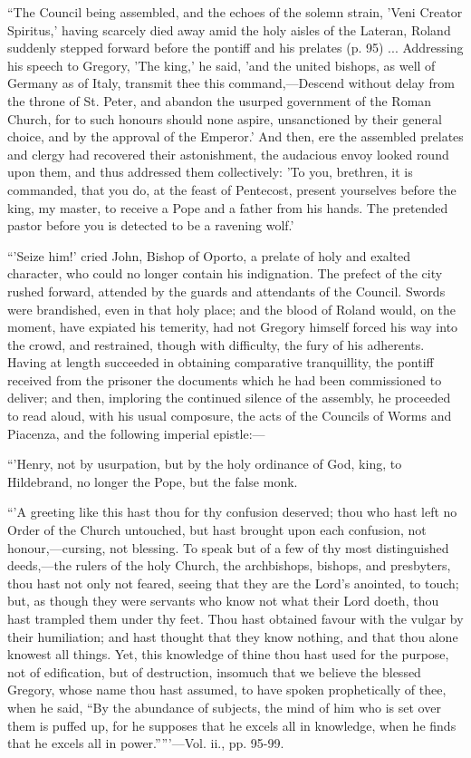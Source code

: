 ``The
Council being assembled, and the echoes of the solemn strain, 'Veni
Creator Spiritus,' having scarcely died away amid the holy aisles of
the Lateran, Roland suddenly stepped forward before the pontiff and
his prelates (p. 95) ... Addressing his speech to Gregory, 'The king,'
he said, 'and the united bishops, as well of Germany as of Italy,
transmit thee this command,—Descend without delay from the throne of
St. Peter, and abandon the usurped government of the Roman Church, for
to such honours should none aspire, unsanctioned by their general
choice, and by the approval of the Emperor.' And then, ere the
assembled prelates and clergy had recovered their astonishment, the
audacious envoy looked round upon them, and thus addressed them
collectively: 'To you, brethren, it is commanded, that you do, at the
feast of Pentecost, present yourselves before the king, my master, to
receive a Pope and a father from his hands. The pretended pastor
before you is detected to be a ravening wolf.'

``'Seize
him!' cried John, Bishop of Oporto, a prelate of holy and exalted
character, who could no longer contain his indignation. The prefect of
the city rushed forward, attended by the guards and attendants of the
Council. Swords were brandished, even in that holy place; and the
blood of Roland would, on the moment, have expiated his temerity, had
not Gregory himself forced his way into the crowd, and restrained,
though with difficulty, the fury of his adherents. Having at length
succeeded in obtaining comparative tranquillity, the pontiff received
from the prisoner the documents which he had been commissioned to
deliver; and then, imploring the continued silence of the assembly, he
proceeded to read aloud, with his usual composure, the acts of the
Councils of Worms and Piacenza, and the following imperial epistle:—

``'Henry,
not by usurpation, but by the holy ordinance of God, king, to
Hildebrand, no longer the Pope, but the false monk.

``'A
greeting like this hast thou for thy confusion deserved; thou who hast
left no Order of the Church untouched, but hast brought upon each
confusion, not honour,—cursing, not blessing. To speak but of a few
of thy most distinguished deeds,—the rulers of the holy Church, the
archbishops, bishops, and presbyters, thou hast not only not feared,
seeing that they are the Lord's anointed, to touch; but, as though
they were servants who know not what their Lord doeth, thou hast
trampled them under thy feet. Thou hast obtained favour with the
vulgar by their humiliation; and hast thought that they know nothing,
and that thou alone knowest all things. Yet, this knowledge
of thine thou hast used for the purpose, not of edification, but of
destruction, insomuch that we believe the blessed Gregory, whose name
thou hast assumed, to have spoken prophetically of thee, when he said,
``By the abundance of subjects, the mind of him who is set over them is
puffed up, for he supposes that he excels all in knowledge, when he
finds that he excels all in power.'''''—Vol. ii., pp. 95-99.

